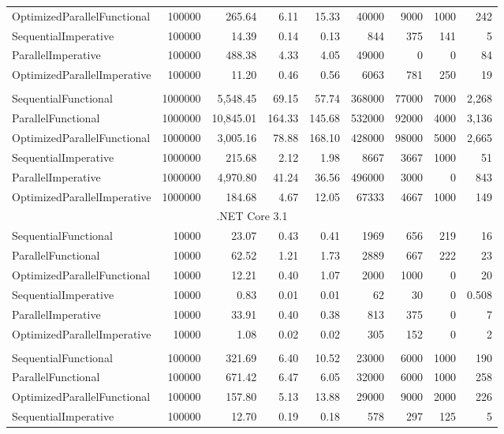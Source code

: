 \begin{table}
\begin{tabularx}{\linewidth}{Xrrrrrrrr}
OptimizedParallelFunctional	&	100000	&	265.64	&	6.11	&	15.33	&	40000	&	9000	&	1000	&	242	\\
SequentialImperative	&	100000	&	14.39	&	0.14	&	0.13	&	844	&	375	&	141	&	5	\\
ParallelImperative	&	100000	&	488.38	&	4.33	&	4.05	&	49000	&	0	&	0	&	84	\\
OptimizedParallelImperative	&	100000	&	11.20	&	0.46	&	0.56	&	6063	&	781	&	250	&	19	\\
&&&&&&&&\\
SequentialFunctional	&	1000000	&	5,548.45	&	69.15	&	57.74	&	368000	&	77000	&	7000	&	2,268	\\
ParallelFunctional	&	1000000	&	10,845.01	&	164.33	&	145.68	&	532000	&	92000	&	4000	&	3,136	\\
OptimizedParallelFunctional	&	1000000	&	3,005.16	&	78.88	&	168.10	&	428000	&	98000	&	5000	&	2,665	\\
SequentialImperative	&	1000000	&	215.68	&	2.12	&	1.98	&	8667	&	3667	&	1000	&	51	\\
ParallelImperative	&	1000000	&	4,970.80	&	41.24	&	36.56	&	496000	&	3000	&	0	&	843	\\
OptimizedParallelImperative	&	1000000	&	184.68	&	4.67	&	12.05	&	67333	&	4667	&	1000	&	149	\\
      \midrule
			\multicolumn{9}{c}{.NET Core 3.1} \\ 
			\midrule 
SequentialFunctional	&	10000	&	23.07	&	0.43	&	0.41	&	1969	&	656	&	219	&	16	\\
ParallelFunctional	&	10000	&	62.52	&	1.21	&	1.73	&	2889	&	667	&	222	&	23	\\
OptimizedParallelFunctional	&	10000	&	12.21	&	0.40	&	1.07	&	2000	&	1000	&	0	&	20	\\
SequentialImperative	&	10000	&	0.83	&	0.01	&	0.01	&	62	&	30	&	0	&	0.508	\\
ParallelImperative	&	10000	&	33.91	&	0.40	&	0.38	&	813	&	375	&	0	&	7	\\
OptimizedParallelImperative	&	10000	&	1.08	&	0.02	&	0.02	&	305	&	152	&	0	&	2	\\
&&&&&&&&\\
SequentialFunctional	&	100000	&	321.69	&	6.40	&	10.52	&	23000	&	6000	&	1000	&	190	\\
ParallelFunctional	&	100000	&	671.42	&	6.47	&	6.05	&	32000	&	6000	&	1000	&	258	\\
OptimizedParallelFunctional	&	100000	&	157.80	&	5.13	&	13.88	&	29000	&	9000	&	2000	&	226	\\
SequentialImperative	&	100000	&	12.70	&	0.19	&	0.18	&	578	&	297	&	125	&	5	\\

\end{tabularx}
\end{table}
